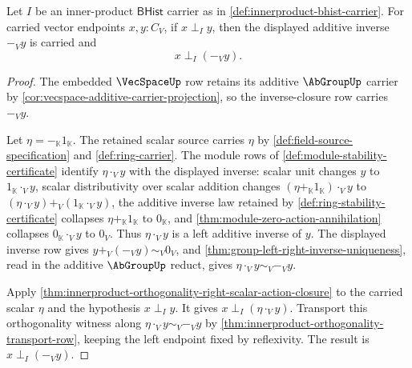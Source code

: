 \begin{theorem}
\label{thm:innerproduct-orthogonal-additive-inverse-closure}
Let $I$ be an inner-product $\mathsf{BHist}$ carrier as in
\autoref{def:innerproduct-bhist-carrier}. For carried vector endpoints
$x,y:C_V$, if $x\perp_I y$, then the displayed additive inverse $-_V y$ is
carried and
$$
x\perp_I(-_V y).
$$
\end{theorem}
\begin{proof}
The embedded $\VecSpaceUp$ row retains its additive $\AbGroupUp$ carrier by
\autoref{cor:vecspace-additive-carrier-projection}, so the inverse-closure row
carries $-_V y$.

Let $\eta=-_{\mathbb{K}}1_{\mathbb{K}}$. The retained scalar source carries
$\eta$ by \autoref{def:field-source-specification} and \autoref{def:ring-carrier}.
The module rows of \autoref{def:module-stability-certificate} identify
$\eta\cdot_V y$ with the displayed inverse: scalar unit changes $y$ to
$1_{\mathbb{K}}\cdot_V y$, scalar distributivity over scalar addition changes
$(\eta+_{\mathbb{K}}1_{\mathbb{K}})\cdot_V y$ to
$(\eta\cdot_V y)+_V(1_{\mathbb{K}}\cdot_V y)$, the additive inverse law retained
by \autoref{def:ring-stability-certificate} collapses
$\eta+_{\mathbb{K}}1_{\mathbb{K}}$ to $0_{\mathbb{K}}$, and
\autoref{thm:module-zero-action-annihilation} collapses $0_{\mathbb{K}}\cdot_V y$
to $0_V$. Thus $\eta\cdot_V y$ is a left additive inverse of $y$. The displayed
inverse row gives $y+_V(-_V y)\sim_V 0_V$, and
\autoref{thm:group-left-right-inverse-uniqueness}, read in the additive
$\AbGroupUp$ reduct, gives $\eta\cdot_V y\sim_V -_V y$.

Apply \autoref{thm:innerproduct-orthogonality-right-scalar-action-closure} to
the carried scalar $\eta$ and the hypothesis $x\perp_I y$. It gives
$x\perp_I(\eta\cdot_V y)$. Transport this orthogonality witness along
$\eta\cdot_V y\sim_V -_V y$ by
\autoref{thm:innerproduct-orthogonality-transport-row}, keeping the left endpoint
fixed by reflexivity. The result is $x\perp_I(-_V y)$.
\end{proof}

